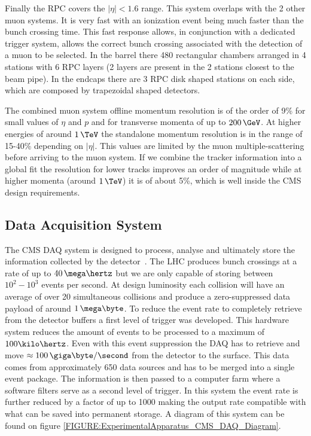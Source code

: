 Finally the \gls{RPC} covers the $|\eta|<1.6$ range. This system overlaps with the 2 other muon systems. It is very fast with an ionization event being much faster than the bunch crossing time. This fast response allows, in conjunction with a dedicated trigger system, allows the correct bunch crossing associated with the detection of a muon to be selected. In the barrel there 480 rectangular chambers arranged in 4 stations with 6 \gls{RPC} layers (2 layers are present in the 2 stations closest to the beam pipe). In the endcaps there are 3 \gls{RPC} disk shaped stations on each side, which are composed by trapezoidal shaped detectors.

The combined muon system offline momentum resolution is of the order of 9\% for small values of $\eta$ and $p$ and for transverse momenta of up to $200\,\GeV$. At higher energies of around $1\,\TeV$ the standalone momentum resolution is in the range of 15-40\% depending on $|\eta|$. This values are limited by the muon multiple-scattering before arriving to the muon system. If we combine the tracker information into a global fit the resolution for lower \pt tracks improves an order of magnitude while at higher momenta (around $1\,\TeV$) it is of about 5\%, which is well inside the \gls{CMS} design requirements.

\subsection{Data Acquisition System}
\label{SUBSECTION:ExperimentalApparatus_CMS_DAQ}


The \gls{CMS} \gls{DAQ} system is designed to process, analyse and ultimately store the information collected by the detector~\cite{CMSTDR:CMSTridasTDRVol2}. The \gls{LHC} produces bunch crossings at a rate of up to $40\,\mega\hertz$ but we are only capable of storing between $10^2-10^3$ events per second. At design luminosity each collision will have an average of over 20 simultaneous collisions and produce a zero-suppressed data payload of around $1\,\mega\byte$. To reduce the event rate to completely retrieve from the detector buffers a first level of trigger was developed. This hardware system reduces the amount of events to be processed to a maximum of $100 \kilo\hertz$. Even with this event suppression the \gls{DAQ} has to retrieve and move $\approx 100\, \giga\byte/\second$ from the detector to the surface. This data comes from approximately 650 data sources and has to be merged into a single event package. The information is then passed to a computer farm where a software filters serve as a second level of trigger. In this system the event rate is further reduced by a factor of up to 1000 making the output rate compatible with what can be saved into permanent storage. A diagram of this system can be found on figure \ref{FIGURE:ExperimentalApparatus_CMS_DAQ_Diagram}.

